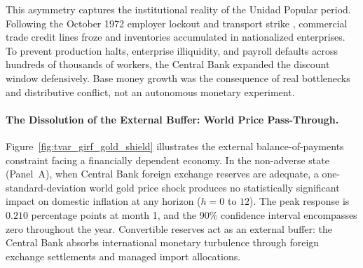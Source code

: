This asymmetry captures the institutional reality of the Unidad Popular period. Following the October 1972 employer lockout and transport strike \citep{Casals2021}, commercial trade credit lines froze and inventories accumulated in nationalized enterprises. To prevent production halts, enterprise illiquidity, and payroll defaults across hundreds of thousands of workers, the Central Bank expanded the discount window defensively. Base money growth was the consequence of real bottlenecks and distributive conflict, not an autonomous monetary experiment.

\paragraph{The Dissolution of the External Buffer: World Price Pass-Through.}
Figure~\ref{fig:tvar_girf_gold_shield} illustrates the external balance-of-payments constraint facing a financially dependent economy. In the non-adverse state (Panel~A), when Central Bank foreign exchange reserves are adequate, a one-standard-deviation world gold price shock produces no statistically significant impact on domestic inflation at any horizon ($h=0$ to $12$). The peak response is $0.210$ percentage points at month 1, and the 90\% confidence interval encompasses zero throughout the year. Convertible reserves act as an external buffer: the Central Bank absorbs international monetary turbulence through foreign exchange settlements and managed import allocations.

